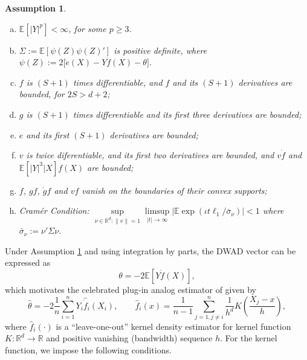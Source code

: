 \documentclass[11pt]{article}
\newtheorem{assumption}{Assumption}
\numberwithin{equation}{section}
\theoremstyle{definition}
\newcommand{\E}{\mathbb{E}}
\newcommand{\R}{\mathbb{R}}
\begin{document}
\begin{assumption}\label{A:DGP} $ $
\begin{enumerate}[(a)]
    \item $\E[|Y|^p]<\infty$, for some $p\geq 3$.
    \item $\Sigma := \E[\psi(Z)\psi(Z)']$ is positive definite, where $\psi(Z) := 2\big[\dot{e}(X) -Y\dot{f}(X) - \theta \big]$.
    \item $f$ is $(S+1)$ times differentiable, and $f$ and its $(S+1)$ derivatives are bounded, for $2S>d+2$;
    \item $g$ is $(S+1)$ times differentiable and its first three derivatives are bounded;
    \item $e$ and its first $(S+1)$ derivatives are bounded;
    \item $v$ is twice diferentiable, and its first two derivatives are bounded, and $v\dot{f}$ and $\E[|Y|^3|X] f(X)$ are bounded;
    \item $f$, $gf$, $\dot{g}f$ and $vf$ vanish on the boundaries of their convex supports;
    \item Cramér Condition:  $\sup\limits_{\nu\in\R^d:\|v\|=1}\limsup\limits_{|t|\to\infty}|\E \exp(\iota t\ell_1/\bar{\sigma}_\nu)|<1$ where $\bar{\sigma}_\nu:=\nu'\Sigma \nu$.
\end{enumerate}
\end{assumption}

Under Assumption \ref{A:DGP} and using integration by parts, the DWAD vector can be expressed as
\begin{equation*}
    \theta = -2\E[Y \dot{f}(X)],
\end{equation*}
which motivates the celebrated plug-in analog estimator of \citet{Powell-Stock-Stoker_1989_ECMA} given by
\begin{equation*}
    \widehat{\theta} = -2\frac{1}{n}\sum_{i=1}^{n} Y_{i} \widehat{\dot{f}}_{i}(X_{i}), \qquad 
    \widehat{f}_{i}(x) = \frac{1}{n-1}\sum_{j=1,j\neq i}^{n} \frac{1}{h^{d}} K\left(\frac{X_{j}-x}{h}\right),
\end{equation*}%
where $\widehat{f}_{i}(\cdot)$ is a ``leave-one-out'' kernel density estimator for kernel function $K:\mathbb{R}^{d}\rightarrow \mathbb{R}$ and positive vanishing (bandwidth) sequence $h$. For the kernel function, we impose the following conditions.
\end{document}
